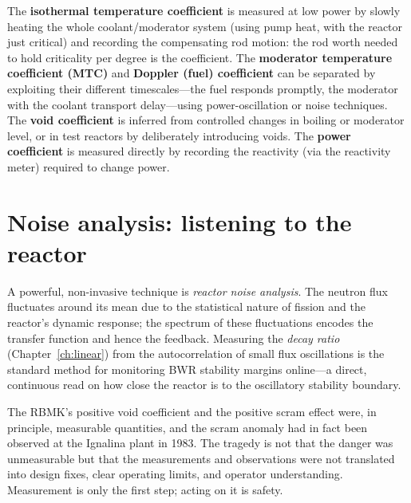 The \textbf{isothermal temperature coefficient} is measured at low power by slowly
heating the whole coolant/moderator system (using pump heat, with the reactor just
critical) and recording the compensating rod motion: the rod worth needed to hold
criticality per degree is the coefficient. The \textbf{moderator temperature
coefficient (MTC)} and \textbf{Doppler (fuel) coefficient} can be separated by
exploiting their different timescales---the fuel responds promptly, the moderator
with the coolant transport delay---using power-oscillation or noise techniques. The
\textbf{void coefficient} is inferred from controlled changes in boiling or
moderator level, or in test reactors by deliberately introducing voids. The
\textbf{power coefficient} is measured directly by recording the reactivity
(via the reactivity meter) required to change power.

\section{Noise analysis: listening to the reactor}

A powerful, non-invasive technique is \emph{reactor noise analysis}. The neutron
flux fluctuates around its mean due to the statistical nature of fission and the
reactor's dynamic response; the spectrum of these fluctuations encodes the
transfer function and hence the feedback. Measuring the \emph{decay ratio}
(Chapter~\ref{ch:linear}) from the autocorrelation of small flux oscillations is
the standard method for monitoring BWR stability margins online---a direct,
continuous read on how close the reactor is to the oscillatory stability boundary.

\begin{remark}
The RBMK's positive void coefficient and the positive scram effect were, in
principle, measurable quantities, and the scram anomaly had in fact been observed
at the Ignalina plant in 1983. The tragedy is not that the danger was unmeasurable
but that the measurements and observations were not translated into design fixes,
clear operating limits, and operator understanding. Measurement is only the first
step; acting on it is safety.
\end{remark}


